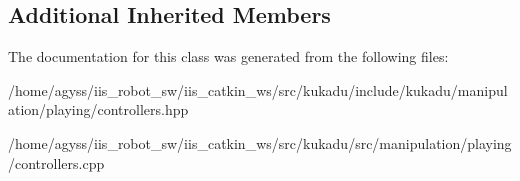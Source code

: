 \subsection*{Additional Inherited Members}


The documentation for this class was generated from the following files\+:\begin{DoxyCompactItemize}
\item 
/home/agyss/iis\+\_\+robot\+\_\+sw/iis\+\_\+catkin\+\_\+ws/src/kukadu/include/kukadu/manipulation/playing/controllers.\+hpp\item 
/home/agyss/iis\+\_\+robot\+\_\+sw/iis\+\_\+catkin\+\_\+ws/src/kukadu/src/manipulation/playing/controllers.\+cpp\end{DoxyCompactItemize}
